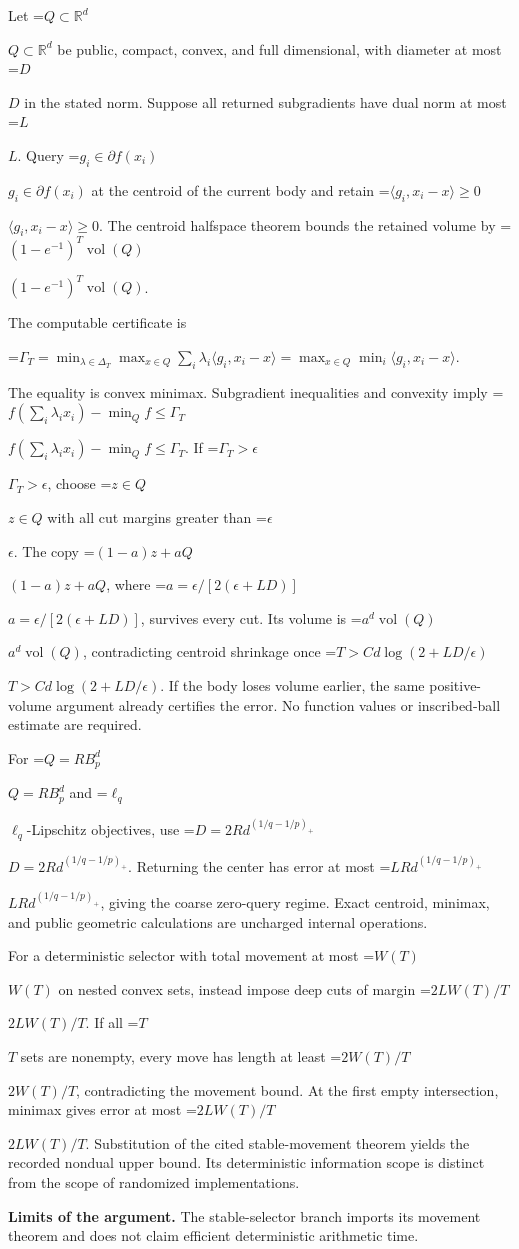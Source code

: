 \documentclass[10pt,a4paper]{article}
\newcommand{\AtlasMath}[1]{\par\begingroup\centering\setbox0=\hbox{$\displaystyle #1$}\ifdim\wd0>1.4\linewidth\typeout{ATLAS WIDE FORMULA: \the\wd0}\fi\ifdim\wd0>\linewidth\resizebox{\linewidth}{!}{\box0}\else\box0\fi\par\endgroup}
\newcommand{\AtlasInlineMath}[1]{\begingroup\setbox0=\hbox{$#1$}\ifdim\wd0>.4\linewidth\endgroup\AtlasMath{#1}\else\endgroup$#1$\fi}
\begin{document}
Let \AtlasInlineMath{Q\subset\mathbb R^d} be public, compact, convex, and full dimensional, with diameter at most \AtlasInlineMath{D} in the stated norm. Suppose all returned subgradients have dual norm at most \AtlasInlineMath{L}. Query \AtlasInlineMath{g_i\in\partial f(x_i)} at the centroid of the current body and retain \AtlasInlineMath{\langle g_i,x_i-x\rangle\ge0}. The centroid halfspace theorem bounds the retained volume by \AtlasInlineMath{(1-e^{-1})^T\operatorname{vol}(Q)}.

The computable certificate is

\AtlasMath{\Gamma_T=\min_{\lambda\in\Delta_T}\max_{x\in Q}\sum_i\lambda_i\langle g_i,x_i-x\rangle
=\max_{x\in Q}\min_i\langle g_i,x_i-x\rangle.}

The equality is convex minimax. Subgradient inequalities and convexity imply
\AtlasInlineMath{f(\sum_i\lambda_ix_i)-\min_Qf\le\Gamma_T}.
If \AtlasInlineMath{\Gamma_T>\epsilon}, choose \AtlasInlineMath{z\in Q} with all cut margins greater than \AtlasInlineMath{\epsilon}. The copy \AtlasInlineMath{(1-a)z+aQ}, where \AtlasInlineMath{a=\epsilon/[2(\epsilon+LD)]}, survives every cut. Its volume is \AtlasInlineMath{a^d\operatorname{vol}(Q)}, contradicting centroid shrinkage once \AtlasInlineMath{T>C d\log(2+LD/\epsilon)}. If the body loses volume earlier, the same positive-volume argument already certifies the error. No function values or inscribed-ball estimate are required.

For \AtlasInlineMath{Q=RB_p^d} and \AtlasInlineMath{\ell_q}-Lipschitz objectives, use \AtlasInlineMath{D=2Rd^{(1/q-1/p)_+}}. Returning the center has error at most \AtlasInlineMath{LRd^{(1/q-1/p)_+}}, giving the coarse zero-query regime. Exact centroid, minimax, and public geometric calculations are uncharged internal operations.

For a deterministic selector with total movement at most \AtlasInlineMath{W(T)} on nested convex sets, instead impose deep cuts of margin \AtlasInlineMath{2LW(T)/T}. If all \AtlasInlineMath{T} sets are nonempty, every move has length at least \AtlasInlineMath{2W(T)/T}, contradicting the movement bound. At the first empty intersection, minimax gives error at most \AtlasInlineMath{2LW(T)/T}. Substitution of the cited stable-movement theorem yields the recorded nondual upper bound. Its deterministic information scope is distinct from the scope of randomized implementations.

\textbf{Limits of the argument.} The stable-selector branch imports its movement theorem and does not claim efficient deterministic arithmetic time.
\end{document}

